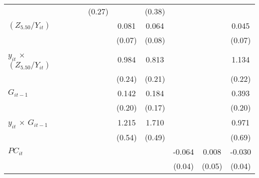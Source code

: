 \documentclass[12pt, a4paper]{article}
\begin{document}
\begin{table}[htbp]
\begin{threeparttable}
{\begin{tabular}{l*{9}{c}}
				&                     &                     &                     &      (0.27)         &                     &      (0.38)         &                     &                     &                     \\
				$(Z_{5.50}/Y_{it})$          &                     &                     &                     &                     &       0.081         &       0.064         &                     &                     &       0.045         \\
				&                     &                     &                     &                     &      (0.07)         &      (0.08)         &                     &                     &      (0.07)         \\
				$y_{it}$ $\times$ $(Z_{5.50}/Y_{it})$&                     &                     &                     &                     &       0.984\sym{***}&       0.813\sym{***}&                     &                     &       1.134\sym{***}\\
				&                     &                     &                     &                     &      (0.24)         &      (0.21)         &                     &                     &      (0.22)         \\
				$G_{it-1}$            &                     &                     &                     &                     &       0.142         &       0.184         &                     &                     &       0.393         \\
				&                     &                     &                     &                     &      (0.20)         &      (0.17)         &                     &                     &      (0.20)         \\
				$y_{it}$ $\times$ $G_{it-1}$&                     &                     &                     &                     &       1.215\sym{*}  &       1.710\sym{***}&                     &                     &       0.971         \\
				&                     &                     &                     &                     &      (0.54)         &      (0.49)         &                     &                     &      (0.69)         \\
				$PC_{it}$               &                     &                     &                     &                     &                     &                     &      -0.064         &       0.008         &      -0.030         \\
				&                     &                     &                     &                     &                     &                     &      (0.04)         &      (0.05)         &      (0.04)         \\

\end{tabular}}
\end{threeparttable}
\end{table}
\end{document}
